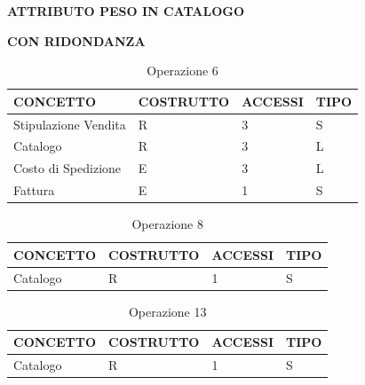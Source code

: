 \centerline{\textbf{ATTRIBUTO PESO IN CATALOGO}}
\newline\newline
\centerline{\textbf{CON RIDONDANZA}}



\begin{table}[H]
\centering
\caption{Operazione 6}
\begin{tabular}{llll}
\\ \hline
\multicolumn{1}{|l|}{\textbf{CONCETTO}} & \multicolumn{1}{l|}{\textbf{COSTRUTTO}} & \multicolumn{1}{l|}{\textbf{ACCESSI}} & \multicolumn{1}{l|}{\textbf{TIPO}} \\ \hline
\multicolumn{1}{|l|}{Stipulazione Vendita}
& \multicolumn{1}{l|}{R}                  & \multicolumn{1}{l|}{3}                & \multicolumn{1}{l|}{S}             \\ \hline
\multicolumn{1}{|l|}{Catalogo}             & \multicolumn{1}{l|}{R}                  & \multicolumn{1}{l|}{3}        
& \multicolumn{1}{l|}{L}             
			 \\ \hline
\multicolumn{1}{|l|}{Costo di Spedizione}     & \multicolumn{1}{l|}{E}                  & \multicolumn{1}{l|}{3}      & \multicolumn{1}{l|}{L}             
			 \\ \hline
\multicolumn{1}{|l|}{Fattura}
& \multicolumn{1}{l|}{E}                  & \multicolumn{1}{l|}{1}                & \multicolumn{1}{l|}{S}             \\ \hline
\end{tabular}
\end{table}

\begin{table}[H]
\centering
\caption{Operazione 8}
\begin{tabular}{llll}
\\ \hline
\multicolumn{1}{|l|}{\textbf{CONCETTO}} & \multicolumn{1}{l|}{\textbf{COSTRUTTO}} & \multicolumn{1}{l|}{\textbf{ACCESSI}} & \multicolumn{1}{l|}{\textbf{TIPO}} \\ \hline
\multicolumn{1}{|l|}{Catalogo}
& \multicolumn{1}{l|}{R}                  & \multicolumn{1}{l|}{1}                & \multicolumn{1}{l|}{S}             \\ \hline
\end{tabular}
\end{table}

\begin{table}[H]
\centering
\caption{Operazione 13}
\begin{tabular}{llll}
\\ \hline
\multicolumn{1}{|l|}{\textbf{CONCETTO}} & \multicolumn{1}{l|}{\textbf{COSTRUTTO}} & \multicolumn{1}{l|}{\textbf{ACCESSI}} & \multicolumn{1}{l|}{\textbf{TIPO}} \\ \hline
\multicolumn{1}{|l|}{Catalogo}
& \multicolumn{1}{l|}{R}                  & \multicolumn{1}{l|}{1}                & \multicolumn{1}{l|}{S}             \\ \hline
\end{tabular}
\end{table}


